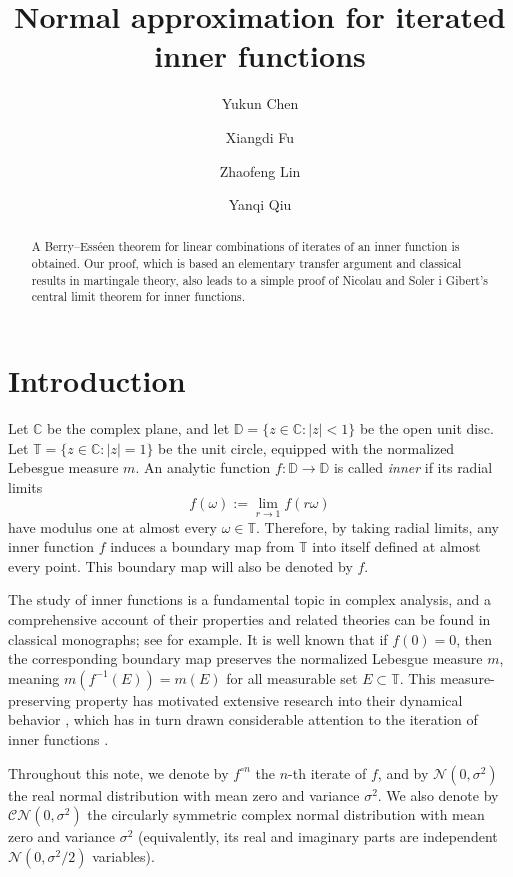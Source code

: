 \documentclass[11pt, reqno]{amsart}
\title{Normal approximation for iterated inner functions}
\author{Yukun Chen}
\author{Xiangdi Fu}
\author{Zhaofeng Lin}
\author{Yanqi Qiu}
\theoremstyle{definition}
\newtheorem*{Brown-Eagleson Theorem}{The Brown-Eagleson Theorem}
\newcommand{\D}{\mathbb D}
\newcommand{\C}{\mathbb C}
\newcommand{\T}{\mathbb T}
\begin{document}
	\begin{abstract}
	 A Berry--Ess\'{e}en theorem for linear combinations of iterates of an inner function is obtained. Our proof, which is based an elementary transfer argument and classical results in martingale theory, also leads to a simple proof of Nicolau and Soler i Gibert's central limit theorem for inner functions.
	\end{abstract}
	\maketitle
	

	

	\section{Introduction}
	Let $\C$ be the complex plane, and let $\D= \{z\in \C: |z|<1\}$ be the open unit disc. Let $\T=\{z\in \C: |z|=1\}$ be the unit circle, equipped with the normalized Lebesgue measure $m$. An analytic function $f:\D \to \D$ is called {\it inner} if its radial limits $$f(\omega):= \lim_{r\to 1} f(r\omega)$$ have modulus one at almost every $\omega\in \T$. Therefore, by taking radial limits, any inner function $f$ induces a boundary map from $\T$ into itself defined at almost every point. This boundary map will also be denoted by $f$. 
	
	The study of inner functions is a fundamental topic in complex analysis, and a comprehensive account of their properties and related theories can be found in classical monographs; see \cite{Gar81} for example. It is well known that if $f(0)=0$, then the corresponding boundary map preserves the normalized Lebesgue measure $m$, meaning $m(f^{-1}(E)) = m (E)$ for all measurable set $E\subset \T$. This measure-preserving property has motivated extensive research into their dynamical behavior \cite{DM91,Pom81}, which has in turn drawn considerable attention to the iteration of inner functions \cite{Nic22,NS22,NS24}.

	Throughout this note, we denote by $f^{\circ n}$ the $n$-th iterate of $f$, and by $\mathcal{N}(0,\sigma^2)$ the real normal distribution with mean zero and variance $\sigma^2$. We also denote by $\mathcal{CN}(0,\sigma^2)$ the circularly symmetric complex normal distribution with mean zero and variance $\sigma^2$ (equivalently, its real and imaginary parts are independent $\mathcal{N}(0,\sigma^2/2)$ variables).
\end{document}
